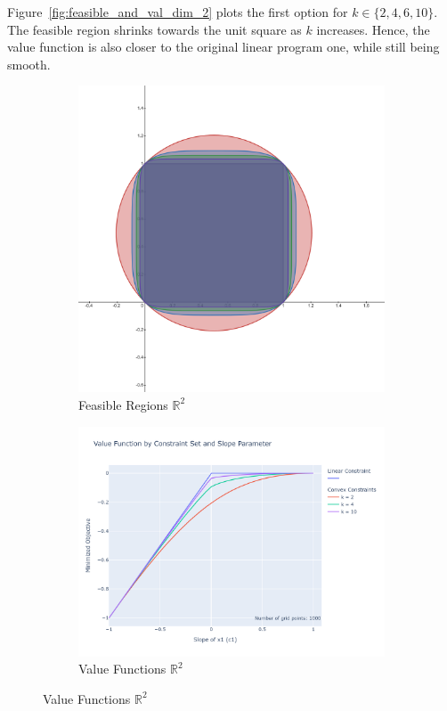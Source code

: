 \documentclass[11pt,a4paper,english]{article} %
\numberwithin{equation}{section}
\numberwithin{figure}{section}
\numberwithin{table}{section}
\theoremstyle{definition}
\theoremstyle{remark}
\begin{document}
Figure~\ref{fig:feasible_and_val_dim_2} plots the first option for $k\in\{2,4,6,10\}$.
The feasible region shrinks towards the unit square as $k$ increases.
Hence, the value function is also closer to the original linear program one, while still being smooth.

\begin{figure}
	\centering
	\caption{Feasible Regions and Value Functions in $\mathbb{R}^2$.}\label{fig:feasible_and_val_dim_2}

	\begin{subfigure}{0.75\textwidth}
		\includegraphics[width=\textwidth]{figures/desmos_dim_2_v2.png}
		\caption{Feasible Regions $\mathbb{R}^2$}
	\end{subfigure}

	\begin{subfigure}{0.75\textwidth}
		\includegraphics[width=\textwidth]{figures/value_function_by_constraint_set_dim_2.png}
		\caption{Value Functions $\mathbb{R}^2$}
	\end{subfigure}
\end{figure}
\end{document}
